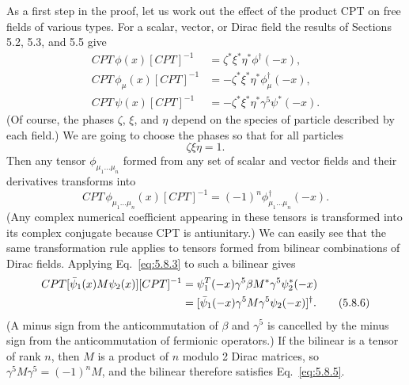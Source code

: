 As a first step in the proof, let us work out the effect of the product CPT on
free fields of various types. For a scalar, vector, or Dirac field the results
of Sections 5.2, 5.3, and 5.5 give
\begin{align}
CPT\,\phi(x)[CPT]^{-1}&=\zeta^*\xi^*\eta^*\phi^\dagger(-x),
\tag{5.8.1}\label{eq:5.8.1}\\
CPT\,\phi_\mu(x)[CPT]^{-1}&=-\zeta^*\xi^*\eta^*\phi_\mu^\dagger(-x),
\tag{5.8.2}\label{eq:5.8.2}\\
CPT\,\psi(x)[CPT]^{-1}&=-\zeta^*\xi^*\eta^*\gamma^5\psi^*(-x).
\tag{5.8.3}\label{eq:5.8.3}
\end{align}
(Of course, the phases $\zeta$, $\xi$, and $\eta$ depend on the species of
particle described by each field.) We are going to choose the phases so that
for all particles
\begin{equation}
\zeta\xi\eta=1.
\tag{5.8.4}\label{eq:5.8.4}
\end{equation}
Then any tensor $\phi_{\mu_1\ldots\mu_n}$ formed from any set of scalar and
vector fields and their derivatives transforms into
\begin{equation}
CPT\,\phi_{\mu_1\ldots\mu_n}(x)[CPT]^{-1}
=(-1)^n\phi^\dagger_{\mu_1\ldots\mu_n}(-x).
\tag{5.8.5}\label{eq:5.8.5}
\end{equation}
(Any complex numerical coefficient appearing in these tensors is transformed
into its complex conjugate because CPT is antiunitary.) We can easily see that
the same transformation rule applies to tensors formed from bilinear
combinations of Dirac fields. Applying Eq.~\eqref{eq:5.8.3} to such a bilinear gives
\begin{align}
CPT[\bar\psi_1(x)M\psi_2(x)][CPT]^{-1}
&=\psi_1^T(-x)\gamma^5\beta M^*\gamma^5\psi_2^*(-x)
\notag\\
&=[\bar\psi_1(-x)\gamma^5M\gamma^5\psi_2(-x)]^\dagger.
\tag{5.8.6}\label{eq:5.8.6}
\end{align}
(A minus sign from the anticommutation of $\beta$ and $\gamma^5$ is cancelled
by the minus sign from the anticommutation of fermionic operators.) If the
bilinear is a tensor of rank $n$, then $M$ is a product of $n$ modulo 2 Dirac
matrices, so $\gamma^5M\gamma^5=(-1)^nM$, and the bilinear therefore satisfies
Eq.~\eqref{eq:5.8.5}.

